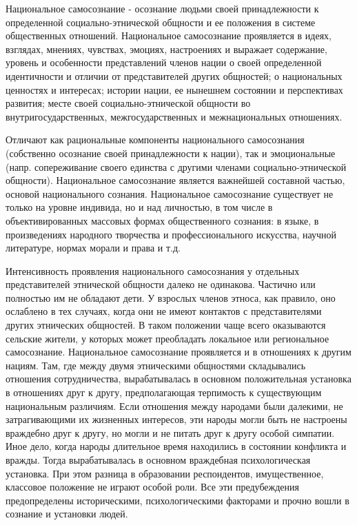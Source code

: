 
Национальное самосознание - осознание людьми своей принадлежности к определенной социально-этнической общности и ее положения в системе общественных отношений. Национальное самосознание проявляется в идеях, взглядах, мнениях, чувствах, эмоциях, настроениях и выражает содержание, уровень и особенности представлений членов нации о своей определенной идентичности и отличии от представителей других общностей; о национальных ценностях и интересах; истории нации, ее нынешнем состоянии и перспективах развития; месте своей социально-этнической общности во внутригосударственных, межгосударственных и межнациональных отношениях.

Отличают как рациональные компоненты национального самосознания (собственно осознание своей принадлежности к нации), так и эмоциональные (напр. сопереживание своего единства с другими членами социально-этнической общности). Национальное самосознание является важнейшей составной частью, основой национального сознания. Национальное самосознание существует не только на уровне индивида, но и над личностью, в том числе в объективированных массовых формах общественного сознания: в языке, в произведениях народного творчества и профессионального искусства, научной литературе, нормах морали и права и т.д.

Интенсивность проявления национального самосознания у отдельных представителей этнической общности далеко не одинакова. Частично или полностью им не обладают дети. У взрослых членов этноса, как правило, оно ослаблено в тех случаях, когда они не имеют контактов с представителями других этнических общностей. В таком положении чаще всего оказываются сельские жители, у которых может преобладать локальное или региональное самосознание.
Национальное самосознание проявляется и в отношениях к другим нациям. Там, где между двумя этническими общностями складывались отношения сотрудничества, вырабатывалась в основном положительная установка в отношениях друг к другу, предполагающая терпимость к существующим национальным различиям. Если отношения между народами были далекими, не затрагивающими их жизненных интересов, эти народы могли быть не настроены враждебно друг к другу, но могли и не питать друг к другу особой симпатии. Иное дело, когда народы длительное время находились в состоянии конфликта и вражды. Тогда вырабатывалась в основном враждебная психологическая установка. При этом разница в образовании респондентов, имущественное, классовое положение не играют особой роли. Все эти предубеждения предопределены историческими, психологическими факторами и прочно вошли в сознание и установки людей.